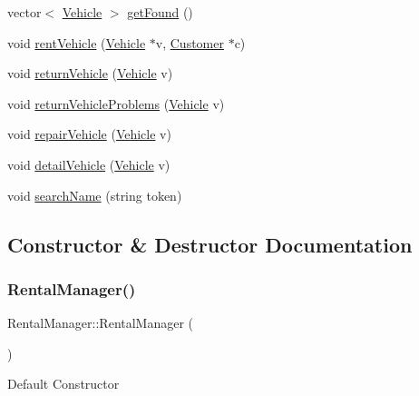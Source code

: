 \begin{DoxyCompactItemize}
\item 
vector$<$ \hyperlink{class_vehicle}{Vehicle} $>$ \hyperlink{class_rental_manager_ad6c19e6ea5a6d78fe010fe4ec577e4e5}{get\+Found} ()
\item 
void \hyperlink{class_rental_manager_ac0d7830b092f29aa063deba6ff422f24}{rent\+Vehicle} (\hyperlink{class_vehicle}{Vehicle} $\ast$v, \hyperlink{class_customer}{Customer} $\ast$c)
\item 
void \hyperlink{class_rental_manager_a372dc4e901586e4e40e697df8c990faa}{return\+Vehicle} (\hyperlink{class_vehicle}{Vehicle} v)
\item 
void \hyperlink{class_rental_manager_afcb0495ecb6cca4d239a14ded559bb0a}{return\+Vehicle\+Problems} (\hyperlink{class_vehicle}{Vehicle} v)
\item 
void \hyperlink{class_rental_manager_a17e836a98a2d3b0c9296dd92c9f86d19}{repair\+Vehicle} (\hyperlink{class_vehicle}{Vehicle} v)
\item 
void \hyperlink{class_rental_manager_a9854197a07ec70ee5300f9f1d6f96996}{detail\+Vehicle} (\hyperlink{class_vehicle}{Vehicle} v)
\item 
void \hyperlink{class_rental_manager_af54e7a73a0419847843bb90b81cf09ff}{search\+Name} (string token)
\end{DoxyCompactItemize}


\subsection{Constructor \& Destructor Documentation}
\mbox{\label{class_rental_manager_a2e8eabdde863514dd4ca13a5e3a4e533}} 
\subsubsection{\texorpdfstring{Rental\+Manager()}{RentalManager()}\hspace{0.1cm}{\footnotesize\ttfamily [1/2]}}
{\footnotesize\ttfamily Rental\+Manager\+::\+Rental\+Manager (\begin{DoxyParamCaption}{ }\end{DoxyParamCaption})}

Default Constructor \mbox{\label{class_rental_manager_a0c8562369e957400e17bd176ee18c91f}} 
